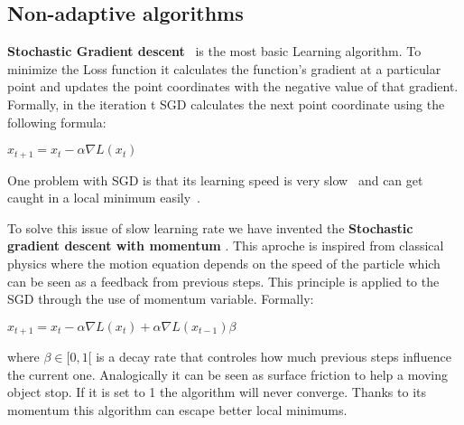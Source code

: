 \documentclass[sigconf]{acmart}
\begin{document}
\subsection{Non-adaptive algorithms}
\textbf{Stochastic Gradient descent}~\cite{kiefer1952} is the most basic Learning algorithm. To minimize the Loss function it calculates the function's gradient at a particular point and updates the point coordinates with the negative value of that gradient.
Formally, in the iteration t SGD calculates the next point coordinate using the following formula:
\begin{center}
    $x_{t+1} = x_t -\alpha  \nabla L(x_t)$
\end{center}
One problem with SGD is that its learning speed is very slow~\cite{SGDSlow} and can get caught in a local minimum easily~\cite{SGDLocalMinimum}.

To solve this issue of slow learning rate we have invented the \textbf{Stochastic gradient descent with momentum} \cite{Qian99onthe}. This aproche is inspired from classical physics where the motion equation depends on the speed of the particle which can be seen as a feedback from previous steps. This principle is applied to the SGD through the use of momentum variable. Formally:
\begin{center}
    $x_{t+1} = x_t -\alpha  \nabla L(x_t) + \alpha  \nabla L(x_{t-1})  \beta$
\end{center}
where $\beta \in [0,1[$ is a decay rate that controles how much previous steps influence the current one. Analogically it can be seen as surface friction to help a moving object stop. If it is set to 1 the algorithm will never converge. Thanks to its momentum this algorithm can escape better local minimums. 
\end{document}
